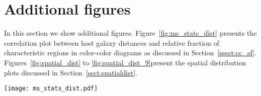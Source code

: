 \documentclass[]{aastex631}
\begin{document}
\section{Additional figures}\label{append:add_fig}
In this section we show additional figures. Figure~\ref{fig:ms_stats_dist} presents the correlation plot between host galaxy distances and relative fraction of characteristic regions in color-color diagrams as discussed in Section~\ref{ssect:cc_sf}. Figures~\ref{fig:spatial_dist} to \ref{fig:spatial_dist_9}present the spatial distribution plots discussed in Section~\ref{sect:spatialdist}.
%
\begin{figure*}
\texttt{[image: ms\_stats\_dist.pdf]}
 \caption{Number fraction of C1 and C2 clusters of each galaxy associated with the main characteristic regions in color-color diagrams found in Section~\ref{ssect:cc_regions} as a function of galaxy distance. We show the YCL, the MAP and the OGC in blue, green and red, respectively. In gray, we show clusters outside the main regions. We distinguish distance measurements which are estimated from stellar markers such as Tip of the Red giant Branch (TRGB) or from Cepheid variable stars are marked with full circles whereas other distant measurements which are less precise are marked by empty circles. A complete discussion on each individual distance measurement is provided in \citet{anand_distances_2020} and \citet{anand_distances_2021}. For each panel we show the Pearson correlation coefficient in the top right.}
 \label{fig:ms_stats_dist}
\end{figure*}
%
\end{document}
